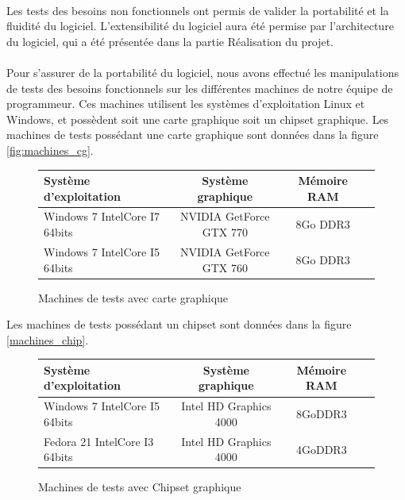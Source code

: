 \paragraph{}
Les tests des besoins non fonctionnels ont permis de valider la portabilité et la fluidité du logiciel. L'extensibilité du logiciel aura été permise par l'architecture du logiciel, qui a été présentée dans la partie Réalisation du projet.

\paragraph{}
Pour s'assurer de la portabilité du logiciel, nous avons effectué les manipulations de tests des besoins fonctionnels sur les différentes machines de notre équipe de programmeur. Ces machines utilisent les systèmes d'exploitation Linux et Windows, et possèdent soit une carte graphique soit un chipset graphique. Les machines de tests possédant une carte graphique sont données dans la figure \ref{fig:machines_cg}.

\begin{figure}[h]
  \begin{changemargin}{-4cm}{-4cm}
    \centering
    \begin{tabular}{|l|c|c|c|}
      \hline
      Système d'exploitation & Système graphique & Mémoire RAM \\ \hline \hline
      Windows 7 IntelCore I7 64bits & NVIDIA GetForce GTX 770 & 8Go DDR3 \\ \hline
      Windows 7 IntelCore I5 64bits & NVIDIA GetForce GTX 760 & 8Go DDR3 \\ \hline
    \end{tabular}
  \end{changemargin}
  \caption{Machines de tests avec carte graphique}
  \label{tab:machines_cg}
\end{figure}

Les machines de tests possédant un chipset sont données dans la figure \ref{machines_chip}.

\begin{figure}[h]
  \begin{changemargin}{-4cm}{-4cm}
    \centering
    \begin{tabular}{|l|c|c|c|}
      \hline
      Système d'exploitation & Système graphique & Mémoire RAM \\ \hline \hline
      Windows 7 IntelCore I5 64bits & Intel HD Graphics 4000 & 8GoDDR3 \\ \hline
      Fedora 21 IntelCore I3 64bits & Intel HD Graphics 4000 & 4GoDDR3 \\ \hline
    \end{tabular}
  \end{changemargin}
  \caption{Machines de tests avec Chipset graphique}
  \label{tab:machines_chip}
\end{figure}

